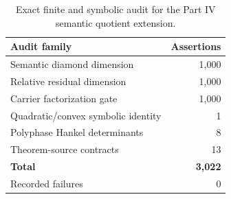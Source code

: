 \begin{table}[htbp]
\centering
\small
\caption{Exact finite and symbolic audit for the Part IV semantic quotient extension.}
\label{tab:block17-validation}
\begin{tabular}{@{}lr@{}}
\toprule
Audit family & Assertions\\
\midrule
Semantic diamond dimension & 1,000\\
Relative residual dimension & 1,000\\
Carrier factorization gate & 1,000\\
Quadratic/convex symbolic identity & 1\\
Polyphase Hankel determinants & 8\\
Theorem-source contracts & 13\\
\midrule
\textbf{Total} & \textbf{3,022}\\
Recorded failures & 0\\
\bottomrule
\end{tabular}
\end{table}
